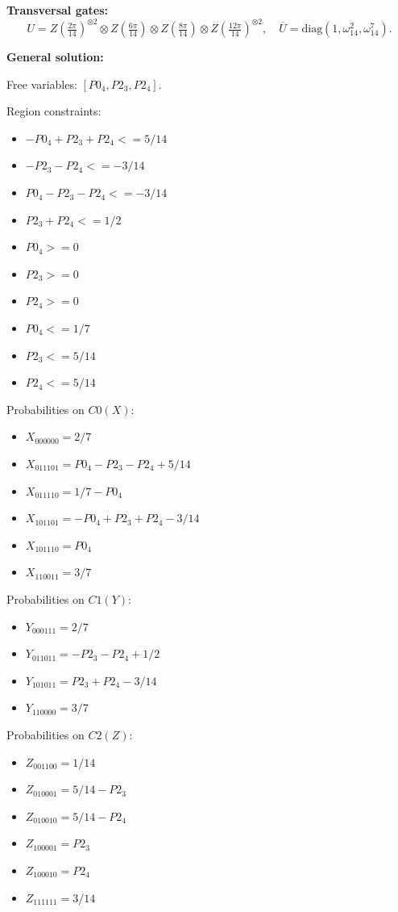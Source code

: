 \documentclass[11pt]{article}
\begin{document}
\noindent\textbf{Transversal gates:}
\[
    U=Z \left(\tfrac{2\pi}{14}\right)^{\otimes2} \otimes Z \left(\tfrac{6\pi}{14}\right) \otimes Z \left(\tfrac{8\pi}{14}\right) \otimes Z \left(\tfrac{12\pi}{14}\right)^{\otimes2},\quad
    \overline U=\mathrm{diag}(1,\omega_{14}^{2},\omega_{14}^{7}).
\]

\noindent\textbf{General solution:}

Free variables: $[P0_4, P2_3, P2_4]$.

Region constraints:
\begin{itemize}
    \item $-P0_4 + P2_3 + P2_4 <= 5/14$
    \item $-P2_3 - P2_4 <= -3/14$
    \item $P0_4 - P2_3 - P2_4 <= -3/14$
    \item $P2_3 + P2_4 <= 1/2$
    \item $P0_4 >= 0$
    \item $P2_3 >= 0$
    \item $P2_4 >= 0$
    \item $P0_4 <= 1/7$
    \item $P2_3 <= 5/14$
    \item $P2_4 <= 5/14$
\end{itemize}

Probabilities on $C0 (X)$:
\begin{itemize}
    \item $X_{000000} = 2/7$
    \item $X_{011101} = P0_4 - P2_3 - P2_4 + 5/14$
    \item $X_{011110} = 1/7 - P0_4$
    \item $X_{101101} = -P0_4 + P2_3 + P2_4 - 3/14$
    \item $X_{101110} = P0_4$
    \item $X_{110011} = 3/7$
\end{itemize}

Probabilities on $C1 (Y)$:
\begin{itemize}
    \item $Y_{000111} = 2/7$
    \item $Y_{011011} = -P2_3 - P2_4 + 1/2$
    \item $Y_{101011} = P2_3 + P2_4 - 3/14$
    \item $Y_{110000} = 3/7$
\end{itemize}

Probabilities on $C2 (Z)$:
\begin{itemize}
    \item $Z_{001100} = 1/14$
    \item $Z_{010001} = 5/14 - P2_3$
    \item $Z_{010010} = 5/14 - P2_4$
    \item $Z_{100001} = P2_3$
    \item $Z_{100010} = P2_4$
    \item $Z_{111111} = 3/14$
\end{itemize}
\end{document}
